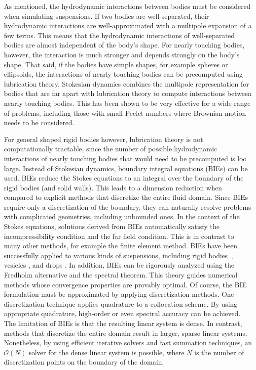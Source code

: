 As mentioned, the hydrodynamic interactions between bodies must be considered when simulating suspensions. If two bodies are well-separated, their hydrodynamic interactions are well-approximated with a multipole expansion of a few terms. This means that the hydrodynamic interactions of well-separated bodies are almost independent of the body's shape. For nearly touching bodies, however, the interaction is much stronger and depends strongly on the body's shape. That said, if the bodies have simple shapes, for example spheres or ellipsoids, the interactions of nearly touching bodies can be precomputed using lubrication theory. Stokesian dynamics \cite{Brady1988, Claeys1993} combines the multipole representation for bodies that are far apart with lubrication theory to compute interactions between nearly touching bodies. This has been shown to be very effective for a wide range of problems, including those with small Peclet numbers where Brownian motion needs to be considered.

For general shaped rigid bodies however, lubrication theory is not computationally tractable, since the number of possible hydrodynamic interactions of nearly touching bodies that would need to be precomputed is loo large. Instead of Stokesian dynamics, boundary integral equations (BIEs) can be used. BIEs reduce the Stokes equations to an integral over the boundary of the rigid bodies (and solid walls). This leads to a dimension reduction when compared to explicit methods that discretize the entire fluid domain. Since BIEs require only a discretization of the boundary, they can naturally resolve problems with complicated geometries, including unbounded ones. In the context of the Stokes equations, solutions derived from BIEs automatically satisfy the  incompressibility condition and the far field condition. This is in contrast to many other methods, for example the finite element method.  BIEs have been successfully applied to various kinds of suspensions, including rigid bodies~\cite{Bystricky2018,Corona2017, Tornberg2006}, vesicles \cite{Quaife2014, Quaife2015, Rahimian2010}, and drops \cite{Sorgentone2018}. In addition, BIEs can be rigorously analyzed using the Fredholm alternative and the spectral theorem. This theory guides numerical methods whose convergence properties are provably optimal. Of course, the BIE formulation must be approximated by applying discretization methods. One discretization technique applies quadrature to a collocation scheme. By using appropriate quadrature, high-order or even spectral accuracy can be achieved. The limitation of BIEs is that the resulting linear system is dense. In contrast, methods that discretize the entire domain result in larger, sparse linear systems. Nonetheless, by using efficient iterative solvers and fast summation techniques, an $\mathcal{O}(N)$ solver for the dense linear system is possible, where $N$ is the number of discretization points on the boundary of the domain.

